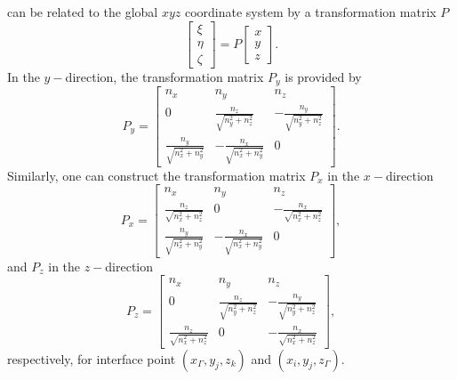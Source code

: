 \documentclass[dissertation]{uathesis}
\begin{document}
\begin{body}
\begin{flushleft}
can be related to the global $xyz$ coordinate system by a transformation matrix $P$
%
\begin{equation}\label{orginal-to-local}
\begin{bmatrix}
\xi \\
\eta \\
\zeta 
\end{bmatrix}
=
P
\begin{bmatrix}
x \\
y \\
z
\end{bmatrix}.
\end{equation}
%
In the $y-$direction, the transformation matrix $P_y$ is provided by
%
\begin{equation}\label{P in y-direction}
P_y=
\begin{bmatrix}
n_{x} &                 n_{y}                    &      n_{z}       \\
0     & \frac{n_{z}}{\sqrt{n^{2}_{y}+n^{2}_{z}}} & -\frac{n_{y}}{\sqrt{n^{2}_{y}+n^{2}_{z}}} \\
\frac{n_{y}}{\sqrt{n^{2}_{x}+n^{2}_{y}}} & -\frac{n_{x}}{\sqrt{n^{2}_{x}+n^{2}_{y}}} & 0
\end{bmatrix}.
\end{equation}
%
Similarly, one can construct the transformation matrix $P_x$ in the $x-$direction
%
\begin{equation}\label{P in x-direction}
P_x=
\begin{bmatrix}
n_{x}                                    &   n_{y}       &      n_{z}       \\
\frac{n_{z}}{\sqrt{n^{2}_{x}+n^{2}_{z}}} & 0             & -\frac{n_{x}}{\sqrt{n^{2}_{x}+n^{2}_{z}}} \\
\frac{n_{y}}{\sqrt{n^{2}_{x}+n^{2}_{y}}} & -\frac{n_{x}}{\sqrt{n^{2}_{x}+n^{2}_{y}}} & 0
\end{bmatrix},
\end{equation}
%
and $P_z$ in the $z-$direction
%
\begin{equation}\label{P in z-direction}
P_z =
\begin{bmatrix}
n_{x} &                   n_{y}                  &                     n_{z}                \\
0     & \frac{n_{z}}{\sqrt{n^{2}_{y}+n^{2}_{z}}} & -\frac{n_{y}}{\sqrt{n^{2}_{y}+n^{2}_{z}}} \\
\frac{n_{z}}{\sqrt{n^{2}_{x}+n^{2}_{z}}}         & 0 &  -\frac{n_{x}}{\sqrt{n^{2}_{x}+n^{2}_{z}}}
\end{bmatrix},
\end{equation}
%
respectively, for interface point $(x_{\Gamma},y_{j},z_{k})$ and $(x_{i},y_{j},z_{\Gamma})$.


\end{flushleft}
\end{body}
\end{document}
